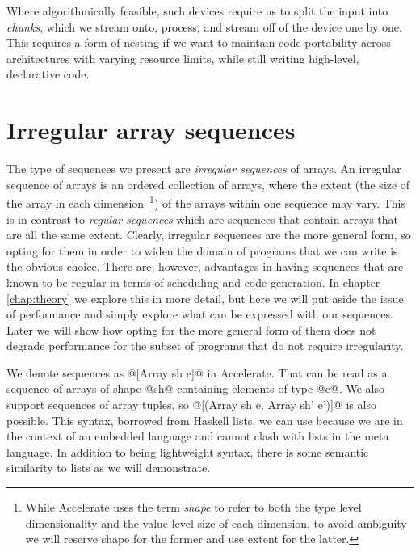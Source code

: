 Where algorithmically feasible, such devices require us to split the input into \emph{chunks}, which we stream onto, process, and stream off of the device one by one. This requires a form of nesting if we want to maintain code portability across architectures with varying resource limits, while still writing high-level, declarative code.

\section{Irregular array sequences}
\label{sec:sequences}

The type of sequences we present are \emph{irregular sequences} of arrays. An irregular sequence of arrays is an ordered collection of arrays, where the extent (the size of the array in each dimension~\footnote{While Accelerate uses the term \emph{shape} to refer to both the type level dimensionality and the value level size of each dimension, to avoid ambiguity we will reserve shape for the former and use extent for the latter.}) of the arrays within one sequence may vary. This is in contrast to \emph{regular sequences} which are sequences that contain arrays that are all the same extent. Clearly, irregular sequences are the more general form, so opting for them in order to widen the domain of programs that we can write is the obvious choice. There are, however, advantages in having sequences that are known to be regular in terms of scheduling and code generation. In chapter \ref{chap:theory} we explore this in more detail, but here we will put aside the issue of performance and simply explore what can be expressed with our sequences. Later we will show how opting for the more general form of them does not degrade performance for the subset of programs that do not require irregularity.

We denote sequences as @[Array sh e]@ in Accelerate. That can be read as a sequence of arrays of shape @sh@ containing elements of type @e@. We also support sequences of array tuples, so @[(Array sh e, Array sh' e')]@ is also possible. This syntax, borrowed from Haskell lists, we can use because we are in the context of an embedded language and cannot clash with lists in the meta language. In addition to being lightweight syntax, there is some semantic similarity to lists as we will demonstrate.


